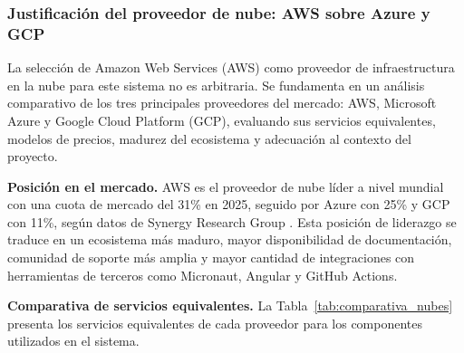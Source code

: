 \newpage
\subsubsection{Justificación del proveedor de nube: AWS sobre Azure y GCP}
\label{subsec:justificacion_aws}

La selección de Amazon Web Services (AWS) como proveedor de
infraestructura en la nube para este sistema no es arbitraria. Se
fundamenta en un análisis comparativo de los tres principales
proveedores del mercado: AWS, Microsoft Azure y Google Cloud Platform
(GCP), evaluando sus servicios equivalentes, modelos de precios,
madurez del ecosistema y adecuación al contexto del proyecto.

\textbf{Posición en el mercado.} AWS es el proveedor de nube líder
a nivel mundial con una cuota de mercado del 31\% en 2025, seguido
por Azure con 25\% y GCP con 11\%, según datos de Synergy Research
Group \cite{aws_vs_azure_gcp_2025}. Esta posición de liderazgo se
traduce en un ecosistema más maduro, mayor disponibilidad de
documentación, comunidad de soporte más amplia y mayor cantidad de
integraciones con herramientas de terceros como Micronaut, Angular
y GitHub Actions.

\textbf{Comparativa de servicios equivalentes.} La
Tabla~\ref{tab:comparativa_nubes} presenta los servicios equivalentes
de cada proveedor para los componentes utilizados en el sistema.


